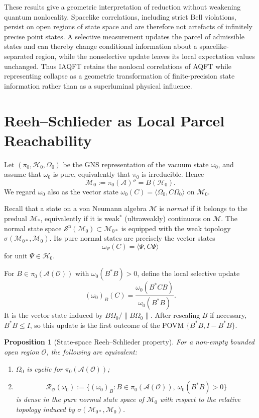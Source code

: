\documentclass[11pt]{article}
\newtheorem{proposition}[theorem]{Proposition}
\newcommand{\A}{\mathcal{A}}
\newcommand{\Sn}{\mathcal{S}^{\mathrm n}}
\begin{document}
These results give a geometric interpretation of reduction without
weakening quantum nonlocality. Spacelike correlations, including strict
Bell violations, persist on open regions of state space and are therefore
not artefacts of infinitely precise point states. A selective measurement
updates the parcel of admissible states and can thereby change conditional
information about a spacelike-separated region, while the nonselective
update leaves its local expectation values unchanged. Thus IAQFT retains
the nonlocal correlations of AQFT while representing collapse as a
geometric transformation of finite-precision state information rather
than as a superluminal physical influence.
\section{Reeh--Schlieder as Local Parcel Reachability}
\label{sec:Reeh-Schlieder}
Let $(\pi_0,\mathcal H_0,\Omega_0)$ be the GNS representation of the
vacuum state $\omega_0$, and assume that $\omega_0$ is pure, equivalently
that $\pi_0$ is irreducible. Hence
\[
\mathcal M_0:=\pi_0(\A)''=B(\mathcal H_0).
\]
We regard $\omega_0$ also as the vector state
$\omega_0(C)=\langle\Omega_0,C\Omega_0\rangle$ on $\mathcal M_0$.

Recall that a state on a von Neumann algebra $\mathcal M$ is
\emph{normal} if it belongs to the predual $\mathcal M_*$, equivalently
if it is weak$^*$ (ultraweakly) continuous on $\mathcal M$. The normal
state space
$\Sn(\mathcal M_0)\subset\mathcal M_{0*}$ is equipped with the weak
topology $\sigma(\mathcal M_{0*},\mathcal M_0)$. Its pure normal states
are precisely the vector states
\[
\omega_\Psi(C)=\langle\Psi,C\Psi\rangle
\]
for unit $\Psi\in\mathcal H_0$.


For $B\in\pi_0(\A(\mathcal O))$ with
$\omega_0(B^*B)>0$, define the local selective update
\[
(\omega_0)_B(C)
=
\frac{\omega_0(B^*CB)}{\omega_0(B^*B)}.
\]
It is the vector state induced by
$B\Omega_0/\|B\Omega_0\|$. After rescaling $B$ if necessary,
$B^*B\leq I$, so this update is the first outcome of the POVM
$\{B^*B,I-B^*B\}$.

\begin{proposition}[State-space Reeh--Schlieder property]
\label{prop:RS-state}
For a non-empty bounded open region $\mathcal O$, the following are
equivalent:
\begin{enumerate}
\item $\Omega_0$ is cyclic for $\pi_0(\A(\mathcal O))$;
\item
\[
\mathcal R_{\mathcal O}(\omega_0)
:=
\{(\omega_0)_B:
B\in\pi_0(\A(\mathcal O)),\ \omega_0(B^*B)>0\}
\]
is dense in the pure normal state space of $\mathcal M_0$ with respect
to the relative topology induced by
$\sigma(\mathcal M_{0*},\mathcal M_0)$.
\end{enumerate}
\end{proposition}
\end{document}
